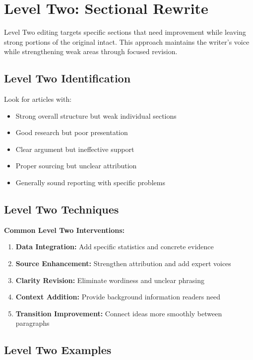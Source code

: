\documentclass[12pt]{article}
\begin{document}
\newpage

\section{Level Two: Sectional Rewrite}
\label{sec:level-two}

Level Two editing targets specific sections that need improvement while leaving strong portions of the original intact. This approach maintains the writer's voice while strengthening weak areas through focused revision.

\subsection{Level Two Identification}

Look for articles with:
\begin{itemize}
    \item Strong overall structure but weak individual sections
    \item Good research but poor presentation
    \item Clear argument but ineffective support
    \item Proper sourcing but unclear attribution
    \item Generally sound reporting with specific problems
\end{itemize}

\subsection{Level Two Techniques}

\textbf{Common Level Two Interventions:}

\begin{enumerate}
    \item \textbf{Data Integration:} Add specific statistics and concrete evidence
    \item \textbf{Source Enhancement:} Strengthen attribution and add expert voices
    \item \textbf{Clarity Revision:} Eliminate wordiness and unclear phrasing
    \item \textbf{Context Addition:} Provide background information readers need
    \item \textbf{Transition Improvement:} Connect ideas more smoothly between paragraphs
\end{enumerate}

\newpage
\subsection{Level Two Examples}
\end{document}
